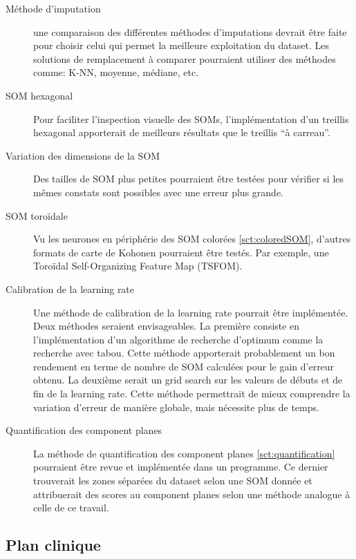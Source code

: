 	\begin{description}
	\item[Méthode d'imputation]
	une comparaison des différentes méthodes d'imputations devrait être faite pour choisir celui qui permet la meilleure exploitation du dataset. Les solutions de remplacement à comparer pourraient utiliser des méthodes comme: K-NN, moyenne, médiane, etc.


	\item[SOM hexagonal]
	Pour faciliter l'inspection visuelle des SOMs, l'implémentation d'un treillis hexagonal apporterait de meilleurs résultats que le treillis ``à carreau''.\cite{Kohonen-som-pak:1995} 

	\item[Variation des dimensions de la SOM]
	Des tailles de SOM plus petites pourraient être testées pour vérifier si les mêmes constats sont possibles avec une erreur plus grande.

	\item[SOM toroïdale]
	Vu les neurones en périphérie des SOM colorées \autoref{sct:coloredSOM}, d'autres formats de carte de Kohonen pourraient être testés. Par exemple, une Toroïdal Self-Organizing Feature Map (TSFOM).

	\item[Calibration de la learning rate]
	Une méthode de calibration de la learning rate pourrait être implémentée. Deux méthodes seraient envisageables. La première consiste en l'implémentation d'un algorithme de recherche d'optimum comme la recherche avec tabou. Cette méthode apporterait probablement un bon rendement en terme de nombre de SOM calculées pour le gain d'erreur obtenu. La deuxième serait un grid search sur les valeurs de débuts et de fin de la learning rate. Cette méthode permettrait de mieux comprendre la variation d'erreur de manière globale, mais nécessite plus de temps.

	\item[Quantification des component planes]
	La méthode de quantification des component planes \autoref{sct:quantification} pourraient être revue et implémentée dans un programme. Ce dernier trouverait les zones séparées du dataset selon une SOM donnée et attribuerait des scores au component planes selon une méthode analogue à celle de ce travail.

	\end{description}

\subsection*{Plan clinique}

